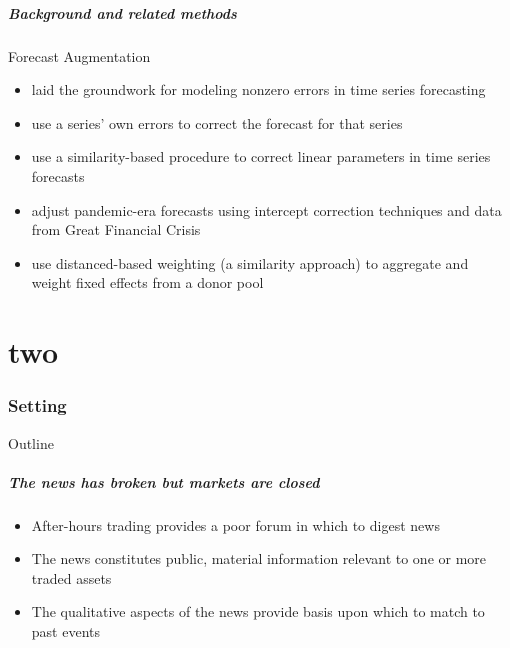 \documentclass{beamer}
\theoremstyle{definition}
\begin{document}
\begin{frame}
    \frametitle{Background and related methods}

    Forecast Augmentation
    \begin{itemize}
        \item \cite[][]{clements1996intercept,clements1998forecasting} laid the groundwork for modeling nonzero errors in time series forecasting
        \item \cite[][]{guerron2017macroeconomic} use a series' own errors to correct the forecast for that series
        \item \cite[][]{dendramis2020similarity} use a similarity-based procedure to correct linear parameters in time series forecasts
        \item \cite[][]{foroni2022forecasting} adjust pandemic-era forecasts using intercept correction techniques and data from Great Financial Crisis
        \item \cite[][]{lin2021minimizing} use distanced-based weighting (a similarity approach) to aggregate and weight fixed effects from a donor pool
    \end{itemize}
\end{frame}

\part{two}
\section{Setting}
\begin{frame}{Outline} %
    \tableofcontents[part=1,currentsection]\tableofcontents
\end{frame}


\begin{frame}
\frametitle{The news has broken but markets are closed}

\begin{itemize}
\item After-hours trading provides a poor forum in which to digest news
\item The news constitutes public, material information relevant to one or more traded assets
\item The qualitative aspects of the news provide basis upon which to match to past events

\end{itemize}
\end{frame}
\end{document}

